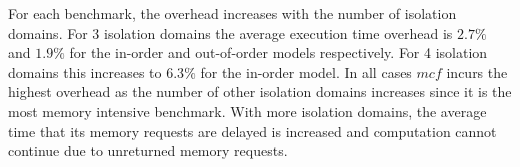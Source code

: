 For each benchmark, the overhead increases with the 
number of isolation domains. For 3 isolation domains the average execution 
time overhead is $2.7\%$ and $1.9\%$ for the in-order and out-of-order models 
respectively. For 4 isolation domains this increases to $6.3\%$ for the in-order 
model. In all cases $mcf$ incurs the highest overhead as the number of other 
isolation domains increases since it is the most memory intensive benchmark. 
With more isolation domains, the average time that its memory requests are delayed 
is increased and computation cannot continue due to unreturned memory requests.

